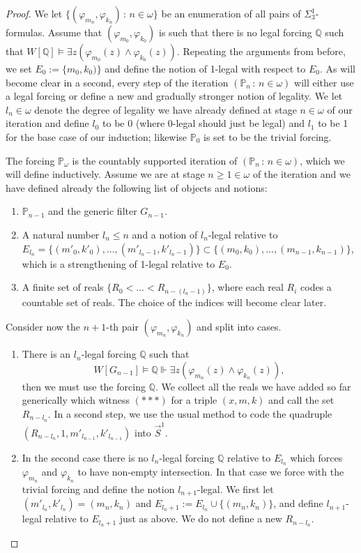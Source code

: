 \documentclass[10pt,a4paper]{amsart}
\newcommand{\forceP}{\mathbb{P}}
\newcommand{\forceQ}{\mathbb{Q}}
\begin{document}
\begin{proof}
We let $\{(\varphi_{m_n}, \varphi_{k_n}) \, : \, n \in \omega \}$ be an enumeration of all pairs of $\Sigma^1_3$-formulas. Assume that $(\varphi_{m_0}, \varphi_{k_0})$ is such that there is no legal forcing $\forceQ$ such that $W[\forceQ] \models \exists z (\varphi_{m_0}(z) \land \varphi_{k_0}(z))$. Repeating the arguments from before, we set $E_0:=\{m_0,k_0) \}$ and define the notion of 1-legal with respect to $E_0$.
As will become clear in a second, every step of the iteration $(\forceP_n \, : \, {n \in\omega})$ will either use a legal forcing or define a new and gradually stronger notion of legality. We let $l_n \in \omega$ denote the degree of legality we have already defined at stage $n \in \omega$ of our iteration and define $l_0$ to be $0$ (where 0-legal should just be legal) and $l_1$ to be 1 for the base case of our induction; likewise $\forceP_0$ is set to be the trivial forcing.

The forcing $\forceP_{\omega}$ is the countably supported iteration of $(\forceP_n \, : \,n \in \omega)$, which we will define inductively.
Assume we are at stage $n  \ge 1 \in \omega$ of the iteration and we have defined already the following list of objects and notions:
\begin{enumerate}
\item $\forceP_{n-1}$ and the generic filter $G_{n-1}$.
\item A natural number $l_n \le n$ and a notion of $l_n$-legal relative to $E_{l_n}= \{ (m'_0,k'_0),...,(m'_{l_n-1},k'_{l_n-1}) \} \subset \{ (m_0,k_0),...,(m_{n-1},k_{n-1}) \} $, which is a strengthening of 1-legal relative to $E_0$.
\item A finite set of reals  $\{R_0<...<R_{n - (l_n -1)} \}$, where each real $R_i$ codes a countable set of reals. The choice of the indices will become clear later.

\end{enumerate}
Consider now the $n+1$-th pair $(\varphi_{m_n}, \varphi_{k_n})$ and split into cases.

\begin{enumerate}
\item[$(a)$] There is an $l_n$-legal forcing $\forceQ$ such that \[W[G_{n-1}] \models \forceQ \Vdash \exists z (\varphi_{m_n} (z) \land \varphi_{k_n} (z)), \] then we must use the forcing $\forceQ$. We collect all the reals we have added so far generically which witness $({\ast} {\ast} {\ast})$ for a triple $(x,m,k)$ and call the set $R_{n-l_n}$. In a second step, we use the usual method to code the quadruple $(R_{{n-l_n}}, 1,m'_{l_{n-1}},k'_{l_{n-1}} )$ into $\vec{S}^1$. 
\item[$(b)$] In the second case there is no $l_{n}$-legal forcing $\forceQ$ relative to $E_{l_n}$ which forces $\varphi_{m_n}$ and $\varphi_{k_n}$ to have non-empty intersection. In that case we force with the trivial forcing and define the notion $l_{n+1}$-legal. We first let $(m'_{l_n},k'_{l_n})=(m_n,k_n)$ and $E_{l_n +1}:= E_{l_n} \cup \{(m_n,k_n)\}$, and define $l_{n+1}$-legal relative to $E_{l_n+1}$ just as above. 
We  do not define a new $R_{n-l_n}$.
\end{enumerate}


\end{proof}
\end{document}
